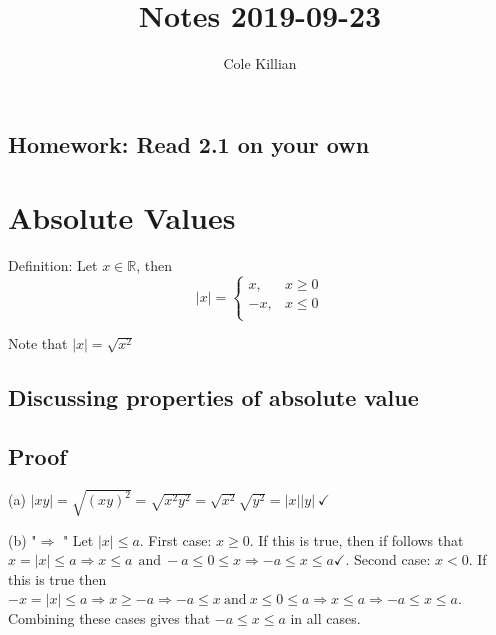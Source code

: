 \documentclass[class=scrartcl, crop=false]{standalone}
\begin{document}
\title{Notes 2019-09-23}
\author{Cole Killian}


\subsection{Homework: Read 2.1 on your own}

\section{Absolute Values}

Definition: Let $x \in \mathbb{R}$, then
\[|x| = 
  \begin{cases}
    x, & x \geq 0 \\
    -x, & x \leq 0 \\
  \end{cases}
\]

Note that $|x| = \sqrt{x^2}$

\subsection{Discussing properties of absolute value}


\subsection{Proof}

(a) $|xy| = \sqrt{(xy)^2} = \sqrt{x^2y^2} = \sqrt{x^2}\sqrt{y^2} = |x||y| \ \checkmark$

(b) "$\Rightarrow$ " Let $|x| \leq a$. First case: $x \geq 0$. If this is true, then if follows that $x = |x| \leq a \Rightarrow x \leq a \ \ \text{and} \ -a \leq 0 \leq x \Rightarrow -a \leq x \leq a \checkmark$. Second case: $x < 0$. If this is true then $-x = |x| \leq a \Rightarrow x \geq -a \Rightarrow -a \leq x \ \text{and} \ x \leq 0 \leq a \Rightarrow x \leq a \Rightarrow -a \leq x \leq a$. Combining these cases gives that $-a \leq x \leq a$ in all cases.
\end{document}
